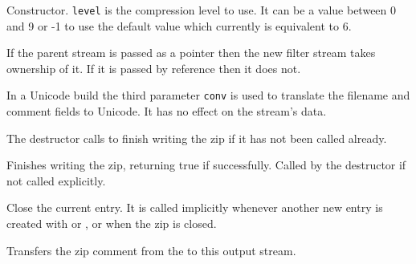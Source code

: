 

\label{wxzipoutputstreamwxzipoutputstream}



Constructor. {\tt level} is the compression level to use.
It can be a value between 0 and 9 or -1 to use the default value
which currently is equivalent to 6.

If the parent stream is passed as a pointer then the new filter stream
takes ownership of it. If it is passed by reference then it does not.

In a Unicode build the third parameter {\tt conv} is used to translate
the filename and comment fields to Unicode. It has no effect on the
stream's data.


\label{wxzipoutputstreamdtor}


The destructor calls  to finish
writing the zip if it has not been called already.


\label{wxzipoutputstreamclose}


Finishes writing the zip, returning true if successfully.
Called by the destructor if not called explicitly.


\label{wxzipoutputstreamcloseentry}


Close the current entry. It is called implicitly whenever another new
entry is created with 
or , or
when the zip is closed.


\label{wxzipoutputstreamcopyarchivemetadata}


Transfers the zip comment from the 
to this output stream.


